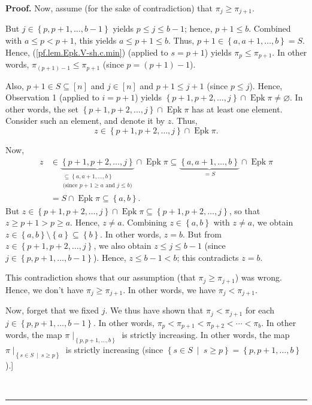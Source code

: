 \documentclass[numbers=enddot,12pt,final,onecolumn,notitlepage]{scrartcl}%
\theoremstyle{definition}
\newenvironment{proof}[1][Proof]{\noindent\textbf{#1.} }{\ \rule{0.5em}{0.5em}}
\newenvironment{verlong}{}{}
\begin{document}
\begin{verlong}
\begin{proof}
Now, assume (for the sake of contradiction) that $\pi_{j}\geq\pi_{j+1}$.

But
$j\in\left\{  p,p+1,\ldots,b-1\right\}  $ yields $p\leq j\leq b-1$; hence,
$p+1\leq b$. Combined with $a\leq p<p+1$, this yields $a\leq p+1\leq b$. Thus,
$p+1\in\left\{  a,a+1,\ldots,b\right\}  =S$. Hence,
(\ref{pf.lem.Epk.V-sh.c.min}) (applied to $s=p+1$) yields $\pi_{p}\leq
\pi_{p+1}$. In other words, $\pi_{\left(  p+1\right)  -1}\leq\pi_{p+1}$ (since
$p=\left(  p+1\right)  -1$).

Also, $p+1\in S\subseteq\left[  n\right]  $ and $j\in\left[  n\right]  $ and
$p+1\leq j+1$ (since $p\leq j$). Hence, Observation 1 (applied to $i=p+1$)
yields $\left\{  p+1,p+2,\ldots,j\right\}  \cap\operatorname{Epk}\pi
\neq\varnothing$. In other words, the set $\left\{  p+1,p+2,\ldots,j\right\}
\cap\operatorname{Epk}\pi$ has at least one element. Consider such an
element, and denote it by $z$. Thus,%
\[
z\in\left\{  p+1,p+2,\ldots,j\right\}  \cap\operatorname{Epk}\pi.
\]


Now,%
\begin{align*}
z  &  \in\underbrace{\left\{  p+1,p+2,\ldots,j\right\}  }_{\substack{\subseteq
\left\{  a,a+1,\ldots,b\right\}  \\\text{(since }p+1\geq a\text{ and }j\leq
b\text{)}}}\cap\operatorname{Epk}\pi
\subseteq
\underbrace{\left\{  a,a+1,\ldots
,b\right\}  }_{=S}\cap\operatorname{Epk}\pi\\
&  =S\cap\operatorname{Epk}\pi
\subseteq \left\{  a,b\right\}  .
\end{align*}
But $z\in\left\{  p+1,p+2,\ldots,j\right\}  \cap\operatorname{Epk} \pi
\subseteq\left\{  p+1,p+2,\ldots,j\right\}  $, so that $z\geq p+1>p\geq a$.
Hence, $z\neq a$. Combining $z\in\left\{  a,b\right\}  $ with $z\neq a$, we
obtain $z\in\left\{  a,b\right\}  \setminus\left\{  a\right\}  \subseteq
\left\{  b\right\}  $. In other words, $z=b$. But from $z\in\left\{
p+1,p+2,\ldots,j\right\}  $, we also obtain $z\leq j\leq b-1$ (since
$j\in\left\{  p,p+1,\ldots,b-1\right\}  $). Hence, $z\leq b-1<b$; this
contradicts $z=b$.

This contradiction shows that our assumption (that $\pi_{j}\geq\pi_{j+1}$) was
wrong. Hence, we don't have $\pi_{j}\geq\pi_{j+1}$. In other words, we have
$\pi_{j}<\pi_{j+1}$.

Now, forget that we fixed $j$. We thus have shown that $\pi_{j}<\pi_{j+1}$ for
each $j\in\left\{  p,p+1,\ldots,b-1\right\}  $. In other words, $\pi_{p}%
<\pi_{p+1}<\pi_{p+2}<\cdots<\pi_{b}$. In other words, the map $\pi
\mid_{\left\{  p,p+1,\ldots,b\right\}  }$ is strictly increasing. In other
words, the map $\pi\mid_{\left\{  s\in S\ \mid\ s\geq p\right\}  }$ is
strictly increasing (since $\left\{  s\in S\ \mid\ s\geq p\right\}  =\left\{
p,p+1,\ldots,b\right\}  $).]


\end{proof}
\end{verlong}
\end{document}
